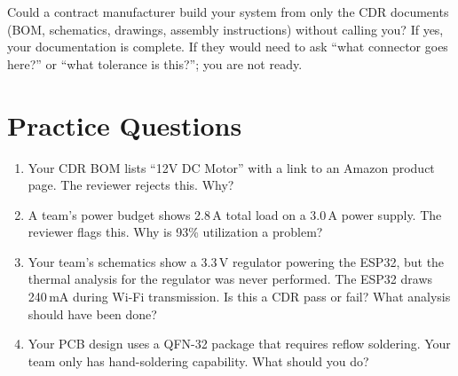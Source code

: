 \documentclass[11pt,letterpaper,twoside,openany]{book}
\begin{document}
\begin{tipbox}
Could a contract manufacturer build your system from only the CDR documents (BOM, schematics, drawings, assembly instructions) without calling you? If yes, your documentation is complete. If they would need to ask ``what connector goes here?'' or ``what tolerance is this?''; you are not ready.
\end{tipbox}

\section{Practice Questions}
\begin{enumerate}[leftmargin=1.5em]
\item Your CDR BOM lists ``12V DC Motor'' with a link to an Amazon product page. The reviewer rejects this. Why?
\item A team's power budget shows 2.8\,A total load on a 3.0\,A power supply. The reviewer flags this. Why is 93\% utilization a problem?

\item Your team's schematics show a 3.3\,V regulator powering the ESP32, but the thermal analysis for the regulator was never performed. The ESP32 draws 240\,mA during Wi-Fi transmission. Is this a CDR pass or fail? What analysis should have been done?
\item Your PCB design uses a QFN-32 package that requires reflow soldering. Your team only has hand-soldering capability. What should you do?
\end{enumerate}
\end{document}
